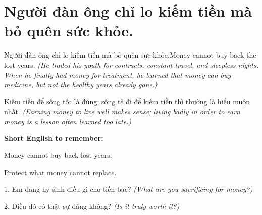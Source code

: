 \section{Người đàn ông chỉ lo kiếm tiền mà bỏ quên sức khỏe.}
\begin{truyen}{Người đàn ông chỉ lo kiếm tiền mà bỏ quên sức khỏe.}{Money cannot buy back the lost years.}
\textit{(He traded his youth for contracts, constant travel, and sleepless nights. When he finally had money for treatment, he learned that money can buy medicine, but not the healthy years already gone.)}
\end{truyen}
\begin{baihoc}
Kiếm tiền để sống tốt là đúng; sống tệ đi để kiếm tiền thì thường là hiểu muộn nhất.
\textit{(Earning money to live well makes sense; living badly in order to earn money is a lesson often learned too late.)}
\end{baihoc}
\begin{ghinhoanh}
\textbf{Short English to remember:}

Money cannot buy back lost years.

Protect what money cannot replace.
\end{ghinhoanh}
\begin{tuhocnhanh}
1. Em đang hy sinh điều gì cho tiền bạc? \textit{(What are you sacrificing for money?)}

2. Điều đó có thật sự đáng không? \textit{(Is it truly worth it?)}
\end{tuhocnhanh}
\ngancach

